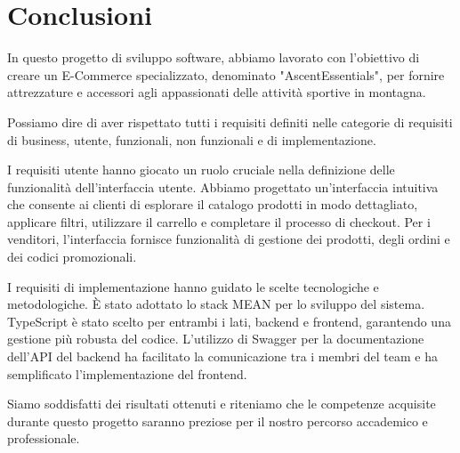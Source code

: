 \chapter{Conclusioni}
In questo progetto di sviluppo software, abbiamo lavorato con l'obiettivo di creare un E-Commerce specializzato, denominato "AscentEssentials", per fornire attrezzature e accessori agli appassionati delle attività sportive in montagna.

Possiamo dire di aver rispettato tutti i requisiti definiti nelle categorie di requisiti di business, utente, funzionali, non funzionali e di implementazione.

I requisiti utente hanno giocato un ruolo cruciale nella definizione delle funzionalità dell'interfaccia utente. Abbiamo progettato un'interfaccia intuitiva che consente ai clienti di esplorare il catalogo prodotti in modo dettagliato, applicare filtri, utilizzare il carrello e completare il processo di checkout. Per i venditori, l'interfaccia fornisce funzionalità di gestione dei prodotti, degli ordini e dei codici promozionali.

I requisiti di implementazione hanno guidato le scelte tecnologiche e metodologiche. È stato adottato lo stack MEAN per lo sviluppo del sistema. TypeScript è stato scelto per entrambi i lati, backend e frontend, garantendo una gestione più robusta del codice. L'utilizzo di Swagger per la documentazione dell'API del backend ha facilitato la comunicazione tra i membri del team e ha semplificato l'implementazione del frontend.

Siamo soddisfatti dei risultati ottenuti e riteniamo che le competenze acquisite durante questo progetto saranno preziose per il nostro percorso accademico e professionale.